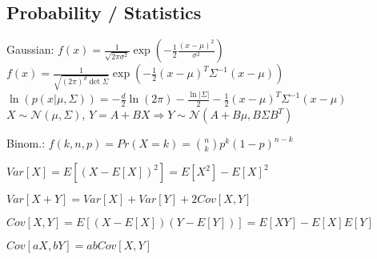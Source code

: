 \subsection*{Probability / Statistics}
\begin{inparaitem}[\color{black}\textbullet]
    \item Gaussian:
    $f(x) = \frac{1}{\sqrt{2\pi \sigma^2}} \exp(- \frac{1}{2} \frac{(x-\mu)^2}{\sigma^2})$\\ %
    $f(x) = \frac{1}{\sqrt{(2\pi)^d\det\Sigma}} \exp(- \frac{1}{2} (x-\mu)^T \Sigma^{-1} (x-\mu))$\\ %
    $\ln(p(x|\mu, \Sigma)) {=} {-}\tfrac{d}{2}\ln(2\pi) {-} \tfrac{\ln|\Sigma|}{2} {-} \tfrac{1}{2}(x{-}\mu)^T\Sigma^{-1}(x{-}\mu)$ \\
    $X {\sim} \mathcal{N}(\mu,\Sigma)$, $Y{=}A{+}BX \Rightarrow Y{\sim}\mathcal{N}(A{+}B\mu,B\Sigma B^T)$\\
    \item Binom.: $f(k,n,p) {=} Pr(X=k) {=} \binom nk p^k (1{-}p)^{n{-}k}$

\item $Var[X]=E[(X-E[X])^2]=E[X^2]-E[X]^2$ \\
\item $Var[X{+}Y]=Var[X]{+}Var[Y]{+}2Cov[X,Y]$ \\
\item $Cov[X,Y] = E[(X - E[X])(Y - E[Y])] = E[XY] - E[X]E[Y]$ \\
\item $Cov[aX,bY]{=}abCov[X,Y]$
\end{inparaitem}

